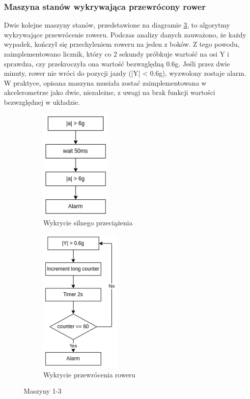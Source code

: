 \subsubsection{Maszyna stanów wykrywająca przewrócony rower}
Dwie kolejne maszyny stanów, przedstawione na diagramie \ref{img:fsm2}, to algorytmy wykrywające przewrócenie roweru. Podczas analizy danych zauważono, że każdy wypadek, kończył się przechyleniem roweru na jeden z boków. Z tego powodu, zaimplementowano licznik, który co 2 sekundy próbkuje wartość na osi Y i sprawdza, czy przekroczyła ona wartość bezwzględną 0.6g. Jeśli przez dwie minuty, rower nie wróci do pozycji jazdy (|Y| < 0.6g), wyzwolony zostaje alarm. W praktyce, opisana maszyna musiała zostać zaimplementowana w akcelerometrze jako dwie, niezależne, z uwagi na brak funkcji wartości bezwzględnej w układzie.
\begin{figure}[h]
    \centering
    \begin{subfigure}[b]{5cm}
    \centering
    \includegraphics[width=3.5cm]{Graphics/All_axis_FSM1.png}
    \caption{Wykrycie silnego przeciążenia}
    \label{img:fsm1}
    \end{subfigure}%
    \hspace{1cm}
    \begin{subfigure}[b]{5cm}
    \centering
    \includegraphics[width=4cm]{Graphics/overturned_FSM2_3.png}
    \caption{Wykrycie przewrócenia roweru}
    \label{img:fsm2}
    \end{subfigure}
    \caption{Maszyny 1-3}
\end{figure}
